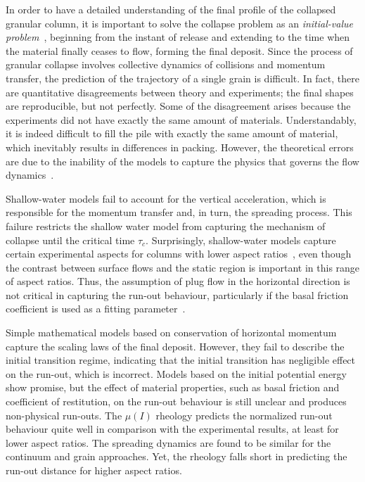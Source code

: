 In order to have a detailed understanding of the final profile of the collapsed 
granular column, it is important to solve the collapse problem as an 
\textit{initial-value problem}~\citep{Balmforth2005}, beginning from the 
instant of release and extending to the time when the material finally ceases 
to flow, forming the final deposit. Since the process of granular collapse 
involves collective dynamics of collisions and momentum transfer, the 
prediction of the trajectory of a single grain is difficult. In fact, there are 
quantitative disagreements between theory and experiments; the final shapes are 
reproducible, but not perfectly. Some of the disagreement arises because the 
experiments did not have exactly the same amount of materials. Understandably, 
it is indeed 
difficult to fill the pile with exactly the same amount of material, which 
inevitably
results in differences in packing. However, the theoretical errors are due to 
the inability of the models to capture the physics that governs the flow 
dynamics~\citep{Balmforth2005}. 

Shallow-water models fail to account for the 
vertical acceleration, which is responsible for the momentum transfer and, in 
turn, the spreading process. This failure restricts the shallow water model 
from capturing the mechanism of collapse until the critical time 
$\tau_{\textit{c}}$. 
Surprisingly, shallow-water models capture certain experimental aspects for 
columns with lower aspect 
ratios~\citep{Mangeney2010,Balmforth2005,Kerswell2005}, even though the 
contrast between surface flows and the static region is important in this range 
of aspect ratios. Thus, the assumption of plug flow in the horizontal direction 
is not critical in capturing the run-out behaviour, particularly if the basal 
friction coefficient is used as a fitting parameter~\citep{Lajeunesse2005}. 

Simple mathematical models based on conservation of horizontal momentum capture 
the scaling laws of the final deposit. However, they fail to describe the 
initial transition regime, indicating that the initial transition has 
negligible effect on the run-out, which is incorrect. Models based on the 
initial potential energy show promise, but the effect of material properties, 
such as basal friction and coefficient of restitution, on the run-out behaviour 
is still unclear and produces non-physical run-outs. The $\mu(\textit{I})$ 
rheology predicts the normalized run-out behaviour quite well in comparison 
with the experimental results, at least for lower aspect ratios. The spreading 
dynamics are found to be similar for the continuum and grain approaches. Yet, 
the rheology falls short in predicting the run-out distance for higher aspect 
ratios. 

